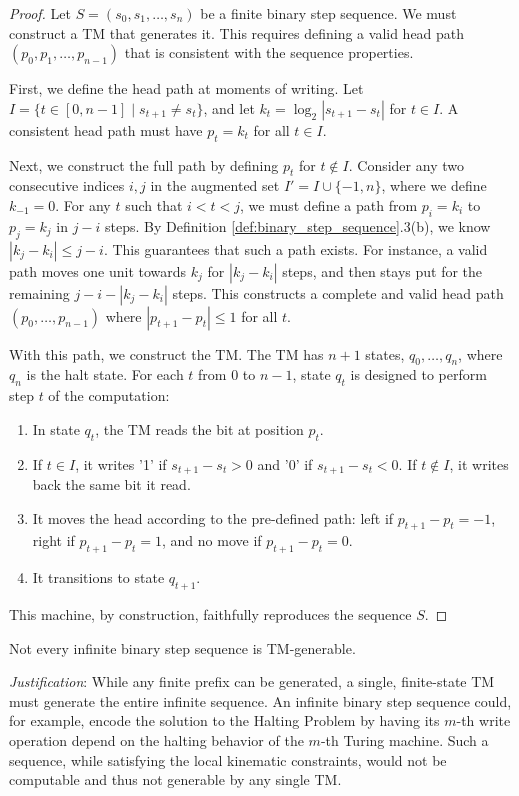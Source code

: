 \begin{proof}
Let $S = (s_0, s_1, \ldots, s_n)$ be a finite binary step sequence. We must construct a TM that generates it. This requires defining a valid head path $(p_0, p_1, \ldots, p_{n-1})$ that is consistent with the sequence properties.

First, we define the head path at moments of writing. Let $I = \{t \in [0, n-1] \mid s_{t+1} \neq s_t\}$, and let $k_t = \log_2|s_{t+1} - s_t|$ for $t \in I$. A consistent head path must have $p_t = k_t$ for all $t \in I$.

Next, we construct the full path by defining $p_t$ for $t \notin I$. Consider any two consecutive indices $i, j$ in the augmented set $I' = I \cup \{-1, n\}$, where we define $k_{-1} = 0$. For any $t$ such that $i < t < j$, we must define a path from $p_i=k_i$ to $p_j=k_j$ in $j-i$ steps. By Definition \ref{def:binary_step_sequence}.3(b), we know $|k_j - k_i| \leq j-i$. This guarantees that such a path exists. For instance, a valid path moves one unit towards $k_j$ for $|k_j - k_i|$ steps, and then stays put for the remaining $j - i - |k_j - k_i|$ steps. This constructs a complete and valid head path $(p_0, \ldots, p_{n-1})$ where $|p_{t+1} - p_t| \leq 1$ for all $t$.

With this path, we construct the TM. The TM has $n+1$ states, $q_0, \ldots, q_n$, where $q_n$ is the halt state. For each $t$ from $0$ to $n-1$, state $q_t$ is designed to perform step $t$ of the computation:
\begin{enumerate}
\item In state $q_t$, the TM reads the bit at position $p_t$.
\item If $t \in I$, it writes '1' if $s_{t+1} - s_t > 0$ and '0' if $s_{t+1} - s_t < 0$. If $t \notin I$, it writes back the same bit it read.
\item It moves the head according to the pre-defined path: left if $p_{t+1}-p_t = -1$, right if $p_{t+1}-p_t=1$, and no move if $p_{t+1}-p_t=0$.
\item It transitions to state $q_{t+1}$.
\end{enumerate}
This machine, by construction, faithfully reproduces the sequence $S$.
\end{proof}

\begin{conjecture}
Not every infinite binary step sequence is TM-generable.
\end{conjecture}

\emph{Justification}: While any finite prefix can be generated, a single, finite-state TM must generate the entire infinite sequence. An infinite binary step sequence could, for example, encode the solution to the Halting Problem by having its $m$-th write operation depend on the halting behavior of the $m$-th Turing machine. Such a sequence, while satisfying the local kinematic constraints, would not be computable and thus not generable by any single TM.

